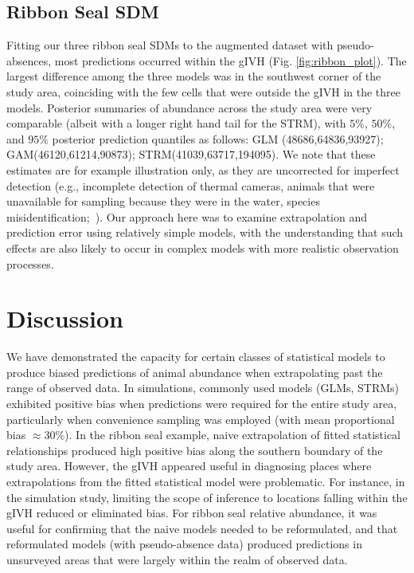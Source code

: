\documentclass[10pt,letterpaper]{article}
\begin{document}
\subsection*{Ribbon Seal SDM}

Fitting our three ribbon seal SDMs to the augmented dataset with pseudo-absences, most predictions occurred within the gIVH (Fig. \ref{fig:ribbon_plot}).  The largest difference among the three models was in the southwest corner of the study area, coinciding with the few cells that were outside the gIVH in the three models.  Posterior summaries of abundance across the study area were very comparable (albeit with a longer right hand tail for the STRM), with $5\%$, $50\%$, and $95\%$ posterior prediction quantiles as follows: GLM (48686,64836,93927); GAM(46120,61214,90873); STRM(41039,63717,194095).  We note that these estimates are for example illustration only, as they are uncorrected for imperfect detection (e.g., incomplete detection of thermal cameras, animals that were unavailable for sampling because they were in the water, species misidentification;~\cite{ConnEtAl2014}).  Our approach here was to examine extrapolation and prediction error using relatively simple models, with the understanding that such effects are also likely to occur in complex models with more realistic observation processes.





\section*{Discussion}

We have demonstrated the capacity for certain classes of statistical models to produce biased predictions of animal abundance when extrapolating past the range of observed data.  In simulations, commonly used models (GLMs, STRMs) exhibited positive bias when predictions were required for the entire study area, particularly when convenience sampling was employed (with mean proportional bias $\approx 30\%$). In the ribbon seal example, naive extrapolation of fitted statistical relationships produced high positive bias along the southern boundary of the study area.  However, the gIVH appeared useful in diagnosing places where extrapolations from the fitted statistical model were problematic.  For instance, in the simulation study, limiting the scope of inference to locations falling within the gIVH reduced or eliminated bias.  For ribbon seal relative abundance, it was useful for confirming that the naive models needed to be reformulated, and that reformulated models (with pseudo-absence data) produced predictions in unsurveyed areas that were largely within the realm of observed data.
\end{document}
